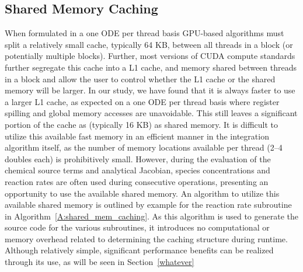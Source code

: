 \documentclass[preprint,12pt]{elsarticle}
\begin{document}
\subsection{Shared Memory Caching}
When formulated in a one ODE per thread basis GPU-based algorithms must split a relatively small cache, typically 64 KB, between all threads in a block (or potentially multiple blocks).
Further, most versions of CUDA compute standards further segregate this cache into a L1 cache, and memory shared between threads in a block and allow the user to control whether the L1 cache or the shared memory will be larger.
In our study, we have found that it is always faster to use a larger L1 cache, as expected on a one ODE per thread basis where register spilling and global memory accesses are unavoidable.
This still leaves a significant portion of the cache as (typically 16 KB) as shared memory.
It is difficult to utilize this available fast memory in an efficient manner in the integration algorithm itself, as the number of memory locations available per thread (2--4 doubles each) is prohibitively small.
However, during the evaluation of the chemical source terms and analytical Jacobian, species concentrations and reaction rates are often used during consecutive operations, presenting an opportunity to use the available shared memory.
An algorithm to utilize this available shared memory is outlined by example for the reaction rate subroutine in Algorithm~\ref{A:shared_mem_caching}.
As this algorithm is used to generate the source code for the various subroutines, it introduces no computational or memory overhead related to determining the caching structure during runtime.
Although relatively simple, significant performance benefits can be realized through its use, as will be seen in Section~\ref{whatever}
\end{document}
